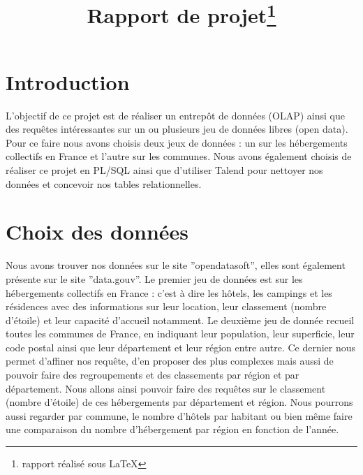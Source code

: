 \documentclass[a4paper,sffamily,12pt]{article}
\title{\vspace{\fill}\LARGE\bfseries\sffamily Rapport de projet\protect\footnote{rapport réalisé sous \LaTeX} \vspace{\fill}}
\begin{document}
	\date{} %
	\maketitle %

	\thispagestyle{fancy} %
	
	\newpage
			
	\renewcommand{\contentsname}{Sommaire}
	\tableofcontents
	
	\newpage
	
	\section{Introduction}

		\vspace{0.5cm}
		
		L'objectif de ce projet est de réaliser un entrepôt de données (OLAP) ainsi que des requêtes intéressantes sur un ou plusieurs jeu de données libres (open data). Pour ce faire nous avons choisis deux jeux de données : un sur les hébergements collectifs en France et l'autre sur les communes. Nous avons également choisis de réaliser ce projet en PL/SQL ainsi que d'utiliser Talend pour nettoyer nos données et concevoir nos tables relationnelles. \\

	\section{Choix des données}				

		\vspace{0.5cm}
		
		 Nous avons trouver nos données sur le site ''opendatasoft'', elles sont également présente sur le site ''data.gouv''. Le premier jeu de données est sur les hébergements collectifs en France : c'est à dire les hôtels, les campings et les résidences avec des informations sur leur location, leur classement (nombre d'étoile) et leur capacité d'accueil notamment. Le deuxième jeu de donnée recueil toutes les communes de France, en indiquant leur population, leur superficie, leur code postal ainsi que leur département et leur région entre autre. Ce dernier nous permet d'affiner nos requête, d'en proposer des plus complexes mais aussi de pouvoir faire des regroupements et des classements par région et par département. Nous allons ainsi pouvoir faire des requêtes sur le classement (nombre d'étoile) de ces hébergements par département et région. Nous pourrons aussi regarder par commune, le nombre d'hôtels par habitant ou bien même faire une comparaison du nombre d'hébergement par région en fonction de l'année. \\
\end{document}

